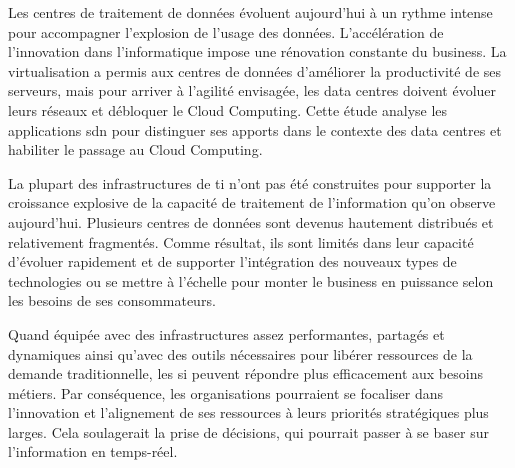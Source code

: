 


Les centres de traitement de données évoluent aujourd'hui à un rythme intense pour accompagner l'explosion de l'usage des données. L'accélération de l'innovation dans l'informatique impose une rénovation constante du business. La virtualisation a permis aux centres de données d'améliorer la productivité de ses serveurs, mais pour arriver à l'agilité envisagée, les data centres doivent évoluer leurs réseaux et débloquer le Cloud Computing. Cette étude analyse les applications \gls{sdn} pour distinguer ses apports dans le contexte des data centres et habiliter le passage au Cloud Computing.

\par 
La plupart des infrastructures de \gls{ti} n'ont pas été construites pour supporter la croissance explosive de la capacité de traitement de l'information qu'on observe aujourd'hui. Plusieurs centres de données sont devenus hautement distribués et relativement fragmentés. Comme résultat, ils sont limités dans leur capacité d'évoluer rapidement et de supporter l'intégration des nouveaux types de technologies ou se mettre à l'échelle pour monter le business en puissance selon les besoins de ses consommateurs.

\par 
Quand équipée avec des infrastructures assez performantes, partagés et dynamiques ainsi qu'avec des outils nécessaires pour libérer ressources de la demande traditionnelle, les \gls{si} peuvent répondre plus efficacement aux besoins métiers. Par conséquence, les organisations pourraient se focaliser dans l'innovation et l'alignement de ses ressources à leurs priorités stratégiques plus larges. Cela soulagerait la prise de décisions, qui pourrait passer à se baser sur l'information en temps-réel.

